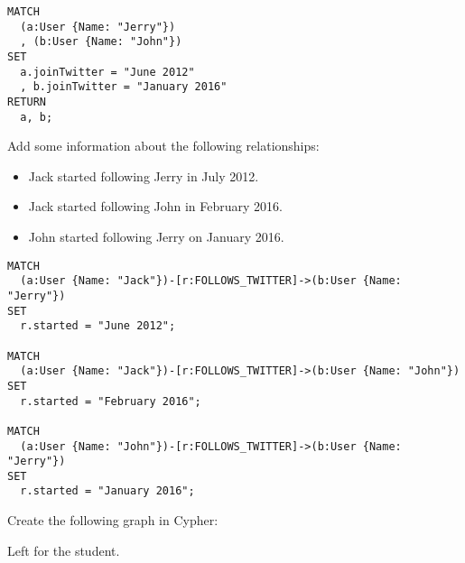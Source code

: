 \begin{questions}
\begin{solution}
\begin{verbatim}
MATCH
  (a:User {Name: "Jerry"})
  , (b:User {Name: "John"})
SET
  a.joinTwitter = "June 2012"
  , b.joinTwitter = "January 2016"
RETURN
  a, b;
  \end{verbatim}
\end{solution}

\question
Add some information about the following relationships:
\begin{itemize}
  \item Jack started following Jerry in July 2012.
  \item Jack started following John in February 2016.
  \item John started following Jerry on January 2016.
\end{itemize}

\begin{solution}
  \begin{verbatim}
MATCH
  (a:User {Name: "Jack"})-[r:FOLLOWS_TWITTER]->(b:User {Name: "Jerry"})
SET
  r.started = "June 2012";
	
MATCH
  (a:User {Name: "Jack"})-[r:FOLLOWS_TWITTER]->(b:User {Name: "John"})
SET
  r.started = "February 2016";
	
MATCH
  (a:User {Name: "John"})-[r:FOLLOWS_TWITTER]->(b:User {Name: "Jerry"})
SET
  r.started = "January 2016";
  \end{verbatim}
\end{solution}

\question
  Create the following graph in Cypher:
  \begin{center}
  \end{center}
\begin{solution}
Left for the student.
\end{solution}



\end{questions}
